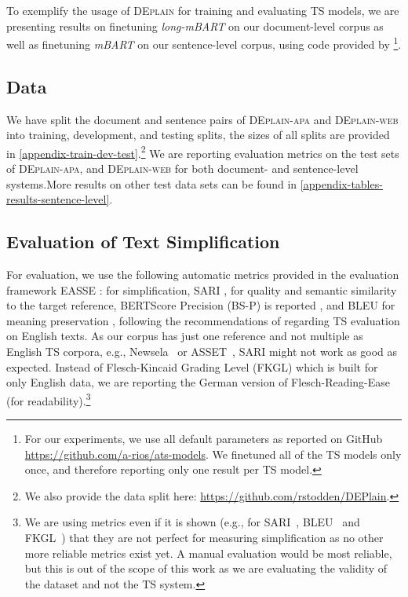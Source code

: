 \documentclass[11pt]{article}
\begin{document}
To exemplify the usage of \textsc{DEplain} for training and evaluating TS models, we are presenting results on finetuning \emph{long-mBART} on our document-level corpus as well as finetuning \emph{mBART} on our sentence-level corpus, using code provided by \citet{rios-etal-2021-new}\footnote{For our experiments, we use all default parameters as reported on GitHub \url{https://github.com/a-rios/ats-models}. We finetuned all of the TS models only once, and therefore reporting only one result per TS model.}.



\subsection{Data}

We have split the document and sentence pairs of \textsc{DEplain-apa} and \textsc{DEplain-web} into training, development, and testing splits, the sizes of all splits are provided in  \autoref{appendix-train-dev-test}.\footnote{We also provide the data split here: \url{https://github.com/rstodden/DEPlain}.} We are reporting evaluation metrics on the test sets of \textsc{DEplain-apa}, and \textsc{DEplain-web} for both document- and sentence-level systems.More results on other test data sets can be found in \autoref{appendix-tables-results-sentence-level}.


\subsection{Evaluation of Text Simplification}

For evaluation, we use the following automatic metrics provided in the evaluation framework EASSE \cite{alva-manchego-etal-2019-easse}: for simplification, SARI \cite{xu-etal-2015-problems}, for quality and semantic similarity to the target reference, BERTScore Precision (BS-P) is reported \cite{zhang2019bertscore}, and BLEU for meaning preservation \cite{papineni-etal-2002-bleu}, following the recommendations of \citet{alva-manchego-etal-2021-un} regarding TS evaluation on English texts. As our corpus has just one reference and not multiple as English TS corpora, e.g., Newsela~\cite{xu-etal-2015-problems} or ASSET~\cite{alva-manchego-etal-2020-asset}, SARI might not work as good as expected.
Instead of Flesch-Kincaid Grading Level (FKGL) which is built for only English data, we are reporting the German version of Flesch-Reading-Ease (for readability).\footnote{We are using metrics even if it is shown (e.g., for SARI~\cite{alva-manchego-etal-2021-un}, BLEU~\cite{sulem-etal-2018-bleu} and FKGL~\cite{tanprasert-kauchak-2021-flesch}) that they are not perfect for measuring simplification as no other more reliable metrics exist yet. A manual evaluation would be most reliable, but this is out of the scope of this work as we are evaluating the validity of the dataset and not the TS system.}
\end{document}
